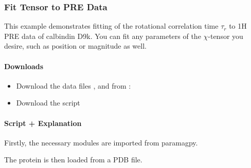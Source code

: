 \documentclass[a4paper,10pt,english,openany,oneside]{sphinxmanual}
\begin{document}
\subsubsection{Fit Tensor to PRE Data}
\label{\detokenize{examples/pre_fit_proton:fit-tensor-to-pre-data}}\label{\detokenize{examples/pre_fit_proton:pre-fit-proton}}\label{\detokenize{examples/pre_fit_proton::doc}}
This example demonstrates fitting of the rotational correlation time \({\tau_r}\) to 1H PRE data of calbindin D9k. You can fit any parameters of the \({\chi}\)-tensor you desire, such as position or magnitude as well.


\paragraph{Downloads}
\label{\detokenize{examples/pre_fit_proton:downloads}}\begin{itemize}
\item {} 
Download the data files ,  and  from :

\item {} 
Download the script 

\end{itemize}


\paragraph{Script + Explanation}
\label{\detokenize{examples/pre_fit_proton:script-explanation}}
Firstly, the necessary modules are imported from paramagpy.

%
\begin{sphinxVerbatim}[commandchars=\\\{\}]
      
\end{sphinxVerbatim}

The protein is then loaded from a PDB file.

%
\begin{sphinxVerbatim}[commandchars=\\\{\}]
  
\end{sphinxVerbatim}
\end{document}
